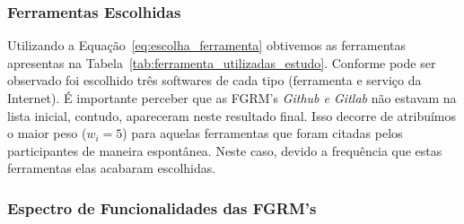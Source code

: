 \subsubsection{Ferramentas Escolhidas}
\label{subsec:resultados_ferramentas_escolhidas}

Utilizando a Equação~\ref{eq:escolha_ferramenta} obtivemos as ferramentas
apresentas na Tabela~\ref{tab:ferramenta_utilizadas_estudo}. Conforme pode ser
observado foi escolhido três softwares de cada tipo (ferramenta e serviço da
Internet). É importante perceber que as FGRM's \textit{Github e Gitlab} não
estavam na lista inicial, contudo, apareceram neste resultado final. Isso
decorre  de atribuímos o maior peso ($w_i = 5$) para aquelas ferramentas que
foram citadas pelos participantes de maneira espontânea.  Neste caso, devido a
frequência que estas ferramentas elas acabaram escolhidas.

\begin{table}[htb]
\centering
\caption{Ferramentas utilizados no estudo}
\label{tab:ferramenta_utilizadas_estudo}
\end{table}


\subsubsection{Espectro de Funcionalidades das FGRM's}
\label{subsec:categorizacao_ferramentas}


